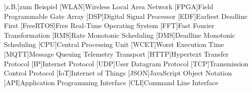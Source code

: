 \documentclass[../EDF Master Thesis.tex]{subfiles}
\begin{document}
    \begin{acronym}[abkuerzungen]
        [z.B.]{zum Beispiel}
        [WLAN]{Wireless Local Area Network}
        [FPGA]{Field Programmable Gate Array}
        [DSP]{Digital Signal Processor}
        [EDF]{Earliest Deadline First}
        [FreeRTOS]{Free Real-Time Operating System}
        [FFT]{Fast Fourier Transformation}
        [RMS]{Rate Monotonic Scheduling}
        [DMS]{Deadline Monotonic Scheduling}
        [CPU]{Central Processing Unit}
        [WCET]{Worst Execution Time}
        [MQTT]{Message Queuing Telemetry Transport}
        [HTTP]{Hypertext Transfer Protocol}
        [IP]{Internet Protocol}
        [UDP]{User Datagram Protocol}
        [TCP]{Transmission Control Protocol}
        [IoT]{Internet of Things}
        [JSON]{JavaScript Object Notation}
        [API]{Application Programming Interface}
        [CLI]{Command Line Interface}
	\end{acronym}
\end{document}
